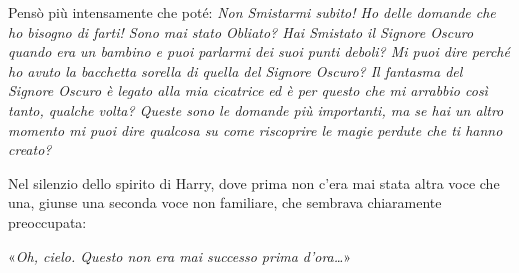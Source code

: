 Pensò più intensamente che poté: \textit{Non Smistarmi subito! Ho delle domande che ho bisogno di farti! Sono mai stato Obliato? Hai Smistato il Signore Oscuro quando era un bambino e puoi parlarmi dei suoi punti deboli? Mi puoi dire perché ho avuto la bacchetta sorella di quella del Signore Oscuro? Il fantasma del Signore Oscuro è legato alla mia cicatrice ed è per questo che mi arrabbio così tanto, qualche volta? Queste sono le domande più importanti, ma se hai un altro momento mi puoi dire qualcosa su come riscoprire le magie perdute che ti hanno creato?}

Nel silenzio dello spirito di Harry, dove prima non c’era mai stata altra voce che una, giunse una seconda voce non familiare, che sembrava chiaramente preoccupata:

«\textit{Oh, cielo. Questo non era mai successo prima d’ora…}»



